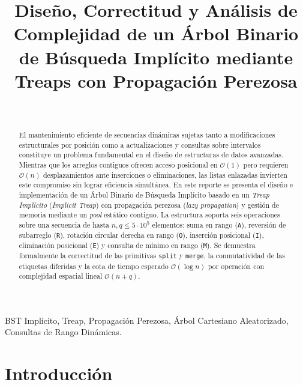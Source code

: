 \documentclass[journal,10pt,a4paper]{IEEEtran}
\begin{document}
\title{Diseño, Correctitud y Análisis de Complejidad de un Árbol Binario de Búsqueda Implícito mediante Treaps con Propagación Perezosa}

\author{
     \\
}

\maketitle

\begin{abstract}
El mantenimiento eficiente de secuencias dinámicas sujetas tanto a modificaciones estructurales por posición como a actualizaciones y consultas sobre intervalos constituye un problema fundamental en el diseño de estructuras de datos avanzadas. Mientras que los arreglos contiguos ofrecen acceso posicional en $\mathcal{O}(1)$ pero requieren $\mathcal{O}(n)$ desplazamientos ante inserciones o eliminaciones, las listas enlazadas invierten este compromiso sin lograr eficiencia simultánea. En este reporte se presenta el diseño e implementación de un Árbol Binario de Búsqueda Implícito basado en un \textit{Treap Implícito} (\textit{Implicit Treap}) con propagación perezosa (\textit{lazy propagation}) y gestión de memoria mediante un \textit{pool} estático contiguo. La estructura soporta seis operaciones sobre una secuencia de hasta $n, q \le 5 \cdot 10^5$ elementos: suma en rango (\texttt{A}), reversión de subarreglo (\texttt{R}), rotación circular derecha en rango (\texttt{O}), inserción posicional (\texttt{I}), eliminación posicional (\texttt{E}) y consulta de mínimo en rango (\texttt{M}). Se demuestra formalmente la correctitud de las primitivas \texttt{split} y \texttt{merge}, la conmutatividad de las etiquetas diferidas y la cota de tiempo esperado $\mathcal{O}(\log n)$ por operación con complejidad espacial lineal $\mathcal{O}(n + q)$.
\end{abstract}

\begin{IEEEkeywords}
BST Implícito, Treap, Propagación Perezosa, Árbol Cartesiano Aleatorizado, Consultas de Rango Dinámicas.
\end{IEEEkeywords}

\section{Introducción}
\end{document}

